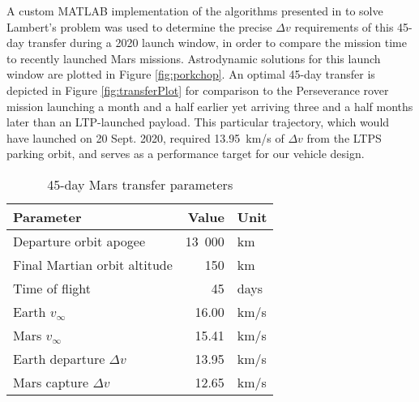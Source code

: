 \documentclass[final,3p,times,twocolumn,sort&compress, lefttitle]{elsarticle}
\begin{document}
            A custom MATLAB implementation of the algorithms presented in \cite{curtis_orbital_2005} to solve Lambert's problem was used to determine the precise $\Delta v$ requirements of this 45-day transfer during a 2020 launch window, in order to compare the mission time to recently launched Mars missions. Astrodynamic solutions for this launch window are plotted in Figure \ref{fig:porkchop}. An optimal 45-day transfer is depicted in Figure \ref{fig:transferPlot} for comparison to the Perseverance rover mission launching a month and a half earlier yet arriving three and a half months later than an LTP-launched payload. This particular trajectory, which would have launched on 20 Sept. 2020, required 13.95~km/s of $\Delta v$ from the LTPS parking orbit, and serves as a performance target for our vehicle design.
            
            \begin{table}[b]
                \centering
                \caption{45-day Mars transfer parameters}
                \label{tab:mars1param}
                \begin{tabular}{@{}lrl@{}}
                    \toprule
                    Parameter                                & Value & Unit \\ \midrule
                    Departure orbit apogee       & 13~000                     & km   \\
                    Final Martian orbit altitude    & 150                       & km   \\
                    Time of flight        & 45                        & days \\
                    Earth $v_\infty$        & 16.00                 & km/s \\
                    Mars $v_\infty$         & 15.41                & km/s \\
                    Earth departure $\Delta v$  & 13.95                 & km/s \\
                    Mars capture $\Delta v$ & 12.65                 & km/s \\ \bottomrule
                \end{tabular}
            \end{table}
            
\end{document}
